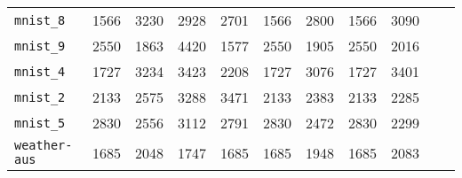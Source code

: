 \begin{tabular}{lccrrrrrrrr}
\texttt{mnist\_8} & 1566 & 3230 & 2928 & 2701 & 1566 & 2800 & 1566 & 3090\\
\texttt{mnist\_9} & 2550 & 1863 & 4420 & 1577 & 2550 & 1905 & 2550 & 2016\\
\texttt{mnist\_4} & 1727 & 3234 & 3423 & 2208 & 1727 & 3076 & 1727 & 3401\\
\texttt{mnist\_2} & 2133 & 2575 & 3288 & 3471 & 2133 & 2383 & 2133 & 2285\\
\texttt{mnist\_5} & 2830 & 2556 & 3112 & 2791 & 2830 & 2472 & 2830 & 2299\\
\texttt{weather-aus} & 1685 & 2048 & 1747 & 1685 & 1685 & 1948 & 1685 & 2083\\
\bottomrule
\end{tabular}
